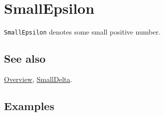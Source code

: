 \documentclass[../FeynCalcManual.tex]{subfiles}
\begin{document}
\hypertarget{smallepsilon}{%
\section{SmallEpsilon}\label{smallepsilon}}

\texttt{SmallEpsilon} denotes some small positive number.

\subsection{See also}

\hyperlink{toc}{Overview}, \hyperlink{smalldelta}{SmallDelta}.

\subsection{Examples}
\end{document}
